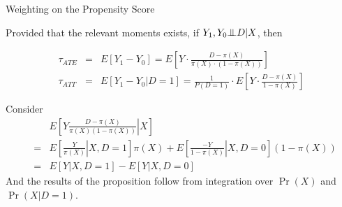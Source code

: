 \documentclass{beamer}
\newcommand{\KeywordTok}[1]{\textcolor[rgb]{0.00,0.44,0.13}{\textbf{{#1}}}}
\newcommand{\FloatTok}[1]{\textcolor[rgb]{0.25,0.63,0.44}{{#1}}}
\newcommand{\StringTok}[1]{\textcolor[rgb]{0.25,0.44,0.63}{{#1}}}
\newcommand{\ErrorTok}[1]{\textcolor[rgb]{1.00,0.00,0.00}{\textbf{{#1}}}}
\newcommand{\NormalTok}[1]{{#1}}
\numberwithin{equation}{section}
\newcommand{\indep}{{\bot\negthickspace\negthickspace\bot}}
\begin{document}



\begin{frame}{Weighting on the Propensity Score}

\small
Provided that the relevant moments exists, if $Y_1,Y_0\indep D |X$, then

\begin{eqnarray*}
\tau_{ATE}&=&E[Y_1-Y_0]=E\left[
Y\cdot \frac{D-\pi(X)}{\pi(X)\cdot (1-\pi(X))}
\right]\\
\tau_{ATT}&=&E[Y_1-Y_0|D=1]=\frac{1}{P(D=1)}\cdot E\left[
Y\cdot \frac{D-\pi(X)}{1-\pi(X)}
\right]
\end{eqnarray*}

\begin{Proof}
\scriptsize Consider
\begin{eqnarray*}
&&E\left[\left.
Y \frac{D-\pi(X)}{\pi(X) (1-\pi(X))}\right| X \right]\\
&=& E\left[\left.\frac{Y}{\pi(X)} \right|X, D=1 \right] \pi(X) + E\left[\left.\frac{-Y}{1-\pi(X)}\right|X, D=0\right] (1-\pi(X))\\
&=& E[Y|X, D=1] - E[Y|X, D=0]
\end{eqnarray*}
And the results of the proposition follow from integration over $\Pr(X)$ and $\Pr(X|D=1)$.
\end{Proof}

\end{frame}
\end{document}
